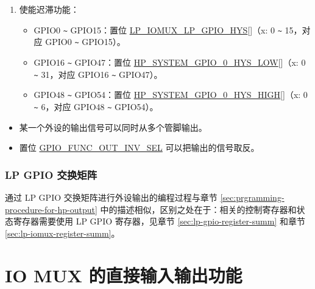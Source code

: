 \documentclass[main\_\_CN.tex]{subfiles}
\begin{document}
\begin{enumerate}
\begin{itemize}
        \item 在开漏模式下，通过置位/清零 \hyperref[fielddesc:IOMUXGPIONFUNWPU]{IO\_MUX\_GPIO\_FUN\_WPU} 和 \hyperref[fielddesc:IOMUXGPIONFUNWPD]{IO\_MUX\_GPIO\_FUN\_WPD} 使能或关闭上拉/下拉电阻。
    \end{itemize}
    \item 使能迟滞功能：
    \begin{itemize}
        \item GPIO0 \verb+~+ GPIO15：置位 \hyperref[fielddesc:LPIOMUXLPGPIOHYS]{LP\_IOMUX\_LP\_GPIO\_HYS}[]（x: 0 \verb+~+ 15，对应 GPIO0 \verb+~+ GPIO15）。
        \item GPIO16 \verb+~+ GPIO47：置位 \hyperref[fielddesc:HPSYSTEMGPIO0HYSLOW]{HP\_SYSTEM\_GPIO\_0\_HYS\_LOW}[]（x: 0 \verb+~+ 31，对应 GPIO16 \verb+~+ GPIO47）。
        \item GPIO48 \verb+~+ GPIO54：置位 \hyperref[fielddesc:HPSYSTEMGPIO0HYSHIGH]{HP\_SYSTEM\_GPIO\_0\_HYS\_HIGH}[]（x: 0 \verb+~+ 6，对应 GPIO48 \verb+~+ GPIO54）。
    \end{itemize}
\end{enumerate}

\begin{tiplisting}
\vspace{-2em}
\begin{itemize}
\item \label{output-note-1} 某一个外设的输出信号可以同时从多个管脚输出。
\item \label{output-note-2} 置位 \hyperref[fielddesc:GPIOFUNCNOUTINVSEL]{GPIO\_FUNC\_OUT\_INV\_SEL} 可以把输出的信号取反。
\end{itemize}
\end{tiplisting}

\subsubsection{LP GPIO 交换矩阵}

通过 LP GPIO 交换矩阵进行外设输出的编程过程与章节  \ref{sec:prgramming-procedure-for-hp-output} 中的描述相似，区别之处在于：相关的控制寄存器和状态寄存器需要使用 LP GPIO 寄存器，见章节 \ref{sec:lp-gpio-register-summ} 和章节 \ref{sec:lp-iomux-register-summ}。

\section{IO MUX 的直接输入输出功能}
\end{document}
